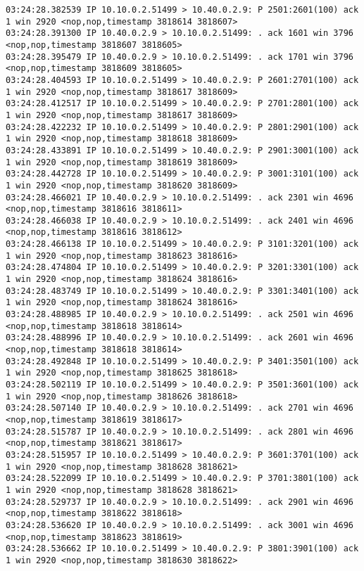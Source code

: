 \documentclass[a4paper,12pt]{article}
\begin{document}
\begin{lstlisting}
03:24:28.382539 IP 10.10.0.2.51499 > 10.40.0.2.9: P 2501:2601(100) ack 1 win 2920 <nop,nop,timestamp 3818614 3818607>
03:24:28.391300 IP 10.40.0.2.9 > 10.10.0.2.51499: . ack 1601 win 3796 <nop,nop,timestamp 3818607 3818605>
03:24:28.395479 IP 10.40.0.2.9 > 10.10.0.2.51499: . ack 1701 win 3796 <nop,nop,timestamp 3818609 3818605>
03:24:28.404593 IP 10.10.0.2.51499 > 10.40.0.2.9: P 2601:2701(100) ack 1 win 2920 <nop,nop,timestamp 3818617 3818609>
03:24:28.412517 IP 10.10.0.2.51499 > 10.40.0.2.9: P 2701:2801(100) ack 1 win 2920 <nop,nop,timestamp 3818617 3818609>
03:24:28.422232 IP 10.10.0.2.51499 > 10.40.0.2.9: P 2801:2901(100) ack 1 win 2920 <nop,nop,timestamp 3818618 3818609>
03:24:28.433891 IP 10.10.0.2.51499 > 10.40.0.2.9: P 2901:3001(100) ack 1 win 2920 <nop,nop,timestamp 3818619 3818609>
03:24:28.442728 IP 10.10.0.2.51499 > 10.40.0.2.9: P 3001:3101(100) ack 1 win 2920 <nop,nop,timestamp 3818620 3818609>
03:24:28.466021 IP 10.40.0.2.9 > 10.10.0.2.51499: . ack 2301 win 4696 <nop,nop,timestamp 3818616 3818611>
03:24:28.466038 IP 10.40.0.2.9 > 10.10.0.2.51499: . ack 2401 win 4696 <nop,nop,timestamp 3818616 3818612>
03:24:28.466138 IP 10.10.0.2.51499 > 10.40.0.2.9: P 3101:3201(100) ack 1 win 2920 <nop,nop,timestamp 3818623 3818616>
03:24:28.474804 IP 10.10.0.2.51499 > 10.40.0.2.9: P 3201:3301(100) ack 1 win 2920 <nop,nop,timestamp 3818624 3818616>
03:24:28.483749 IP 10.10.0.2.51499 > 10.40.0.2.9: P 3301:3401(100) ack 1 win 2920 <nop,nop,timestamp 3818624 3818616>
03:24:28.488985 IP 10.40.0.2.9 > 10.10.0.2.51499: . ack 2501 win 4696 <nop,nop,timestamp 3818618 3818614>
03:24:28.488996 IP 10.40.0.2.9 > 10.10.0.2.51499: . ack 2601 win 4696 <nop,nop,timestamp 3818618 3818614>
03:24:28.492848 IP 10.10.0.2.51499 > 10.40.0.2.9: P 3401:3501(100) ack 1 win 2920 <nop,nop,timestamp 3818625 3818618>
03:24:28.502119 IP 10.10.0.2.51499 > 10.40.0.2.9: P 3501:3601(100) ack 1 win 2920 <nop,nop,timestamp 3818626 3818618>
03:24:28.507140 IP 10.40.0.2.9 > 10.10.0.2.51499: . ack 2701 win 4696 <nop,nop,timestamp 3818619 3818617>
03:24:28.515787 IP 10.40.0.2.9 > 10.10.0.2.51499: . ack 2801 win 4696 <nop,nop,timestamp 3818621 3818617>
03:24:28.515957 IP 10.10.0.2.51499 > 10.40.0.2.9: P 3601:3701(100) ack 1 win 2920 <nop,nop,timestamp 3818628 3818621>
03:24:28.522099 IP 10.10.0.2.51499 > 10.40.0.2.9: P 3701:3801(100) ack 1 win 2920 <nop,nop,timestamp 3818628 3818621>
03:24:28.529737 IP 10.40.0.2.9 > 10.10.0.2.51499: . ack 2901 win 4696 <nop,nop,timestamp 3818622 3818618>
03:24:28.536620 IP 10.40.0.2.9 > 10.10.0.2.51499: . ack 3001 win 4696 <nop,nop,timestamp 3818623 3818619>
03:24:28.536662 IP 10.10.0.2.51499 > 10.40.0.2.9: P 3801:3901(100) ack 1 win 2920 <nop,nop,timestamp 3818630 3818622>

\end{lstlisting}
\end{document}

